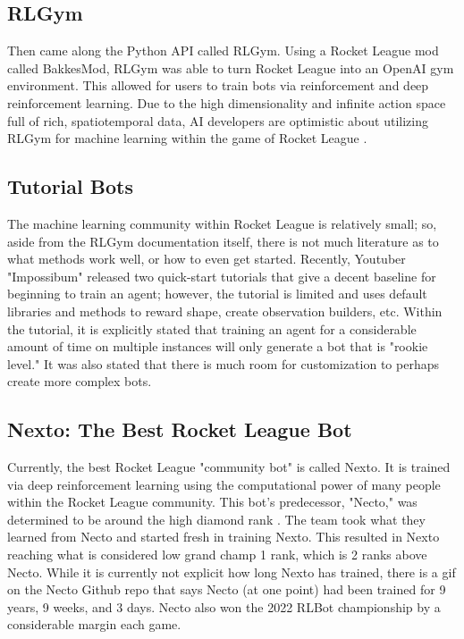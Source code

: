 \documentclass[10pt,twocolumn]{article}
\begin{document}
\subsection{RLGym}
Then came along the Python API called RLGym. Using a Rocket League mod called BakkesMod, RLGym was able to turn Rocket League into an OpenAI gym environment. This allowed for users to train bots via reinforcement and deep reinforcement learning. Due to the high dimensionality and infinite action space full of rich, spatiotemporal data, AI developers are optimistic about utilizing RLGym for machine learning within the game of Rocket League \cite{inproceedings}.

\subsection{Tutorial Bots}
The machine learning community within Rocket League is relatively small; so, aside from the RLGym documentation itself, there is not much literature as to what methods work well, or how to even get started. Recently, Youtuber "Impossibum" released two quick-start tutorials that give a decent baseline for beginning to train an agent; however, the tutorial is limited and uses default libraries and methods to reward shape, create observation builders, etc. Within the tutorial, it is explicitly stated that training an agent for a considerable amount of time on multiple instances will only generate a bot that is "rookie level." It was also stated that there is much room for customization to perhaps create more complex bots.

\subsection{Nexto: The Best Rocket League Bot}
Currently, the best Rocket League "community bot" is called Nexto. It is trained via deep reinforcement learning using the computational power of many people within the Rocket League community. This bot's predecessor, "Necto," was determined to be around the high diamond rank \cite{github}. The team took what they learned from Necto and started fresh in training Nexto. This resulted in Nexto reaching what is considered low grand champ 1 rank, which is 2 ranks above Necto. While it is currently not explicit how long Nexto has trained, there is a gif on the Necto Github repo that says Necto (at one point) had been trained for 9 years, 9 weeks, and 3 days. Necto also won the 2022 RLBot championship by a considerable margin each game.
\end{document}
